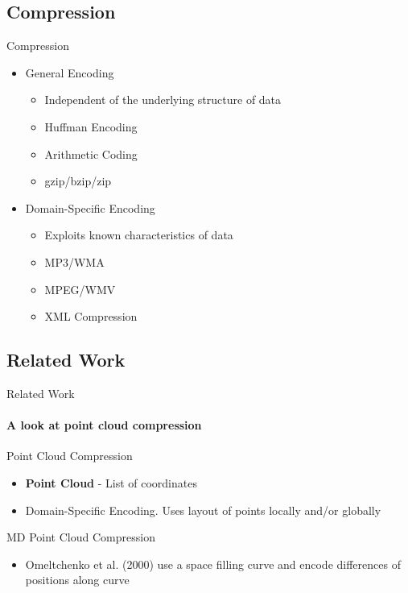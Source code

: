 \documentclass{beamer}
\begin{document}
\subsection{Compression}
\begin{frame}{Compression}
 \begin{itemize}
  \item General Encoding
  \begin{itemize}
   \item Independent of the underlying structure of data
   \item Huffman Encoding
   \item Arithmetic Coding
   \item gzip/bzip/zip
  \end{itemize}
 \item Domain-Specific Encoding
  \begin{itemize}
   \item Exploits known characteristics of data
   \item MP3/WMA 
   \item MPEG/WMV
   \item XML Compression
  \end{itemize}
 \end{itemize}
\end{frame}


\subsection{Related Work}
\begin{frame}{Related Work}
  \framesubtitle{A look at point cloud compression}
  Point Cloud Compression
  \begin{itemize}
  \item \textbf{Point Cloud} - List of coordinates
  \item Domain-Specific Encoding. Uses layout of points locally and/or
    globally
  \end{itemize}
  MD Point Cloud Compression
  \begin{itemize}
  \item Omeltchenko et al. (2000) use a space filling curve and encode
    differences of positions along curve
  \end{itemize}
\end{frame}
\end{document}
